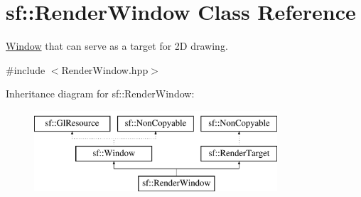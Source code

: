\hypertarget{classsf_1_1_render_window}{}\section{sf\+:\+:Render\+Window Class Reference}
\label{classsf_1_1_render_window}


\mbox{\hyperlink{classsf_1_1_window}{Window}} that can serve as a target for 2D drawing.  




{\ttfamily \#include $<$Render\+Window.\+hpp$>$}

Inheritance diagram for sf\+:\+:Render\+Window\+:\begin{figure}[H]
\begin{center}
\leavevmode
\includegraphics[height=3.000000cm]{classsf_1_1_render_window}
\end{center}
\end{figure}
